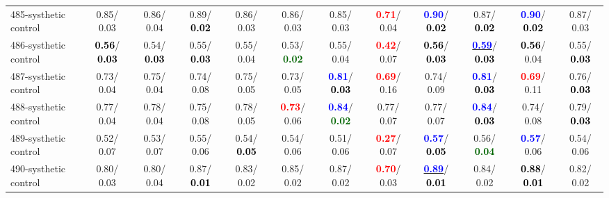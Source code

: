 \begin{table}[h]
\begin{center}
{\begin{tabular}{lc|c|c|c|c|c|c|c|c|c|c}
485-systhetic control &   0.85/  0.03 &   0.86/  0.04 &   0.89/\textcolor{black}{\textbf{  0.02}} &   0.86/  0.03 &   0.86/  0.03 &   0.85/  0.03 & \textcolor{red}{\textbf{  0.71}}/  0.04 & \textcolor{blue}{\textbf{  0.90}}/\textcolor{black}{\textbf{  0.02}} &   0.87/\textcolor{black}{\textbf{  0.02}} & \textcolor{blue}{\textbf{  0.90}}/\textcolor{black}{\textbf{  0.02}} &   0.87/  0.03 \\
486-systhetic control & \textcolor{black}{\textbf{  0.56}}/\textcolor{black}{\textbf{  0.03}} &   0.54/\textcolor{black}{\textbf{  0.03}} &   0.55/\textcolor{black}{\textbf{  0.03}} &   0.55/  0.04 &   0.53/\textcolor{darkgreen}{\textbf{  0.02}} &   0.55/  0.04 & \textcolor{red}{\textbf{  0.42}}/  0.07 & \textcolor{black}{\textbf{  0.56}}/\textcolor{black}{\textbf{  0.03}} & \underline{\textcolor{blue}{\textbf{  0.59}}}/\textcolor{black}{\textbf{  0.03}} & \textcolor{black}{\textbf{  0.56}}/  0.04 &   0.55/\textcolor{black}{\textbf{  0.03}} \\
487-systhetic control &   0.73/  0.04 &   0.75/  0.04 &   0.74/  0.08 &   0.75/  0.05 &   0.73/  0.05 & \textcolor{blue}{\textbf{  0.81}}/\textcolor{black}{\textbf{  0.03}} & \textcolor{red}{\textbf{  0.69}}/  0.16 &   0.74/  0.09 & \textcolor{blue}{\textbf{  0.81}}/\textcolor{black}{\textbf{  0.03}} & \textcolor{red}{\textbf{  0.69}}/  0.11 &   0.76/\textcolor{black}{\textbf{  0.03}} \\ \hline
488-systhetic control &   0.77/  0.04 &   0.78/  0.04 &   0.75/  0.08 &   0.78/  0.05 & \textcolor{red}{\textbf{  0.73}}/  0.06 & \textcolor{blue}{\textbf{  0.84}}/\textcolor{darkgreen}{\textbf{  0.02}} &   0.77/  0.07 &   0.77/  0.07 & \textcolor{blue}{\textbf{  0.84}}/\textcolor{black}{\textbf{  0.03}} &   0.74/  0.08 &   0.79/\textcolor{black}{\textbf{  0.03}} \\
489-systhetic control &   0.52/  0.07 &   0.53/  0.07 &   0.55/  0.06 &   0.54/\textcolor{black}{\textbf{  0.05}} &   0.54/  0.06 &   0.51/  0.06 & \textcolor{red}{\textbf{  0.27}}/  0.07 & \textcolor{blue}{\textbf{  0.57}}/\textcolor{black}{\textbf{  0.05}} &   0.56/\textcolor{darkgreen}{\textbf{  0.04}} & \textcolor{blue}{\textbf{  0.57}}/  0.06 &   0.54/  0.06 \\
490-systhetic control &   0.80/  0.03 &   0.80/  0.04 &   0.87/\textcolor{black}{\textbf{  0.01}} &   0.83/  0.02 &   0.85/  0.02 &   0.87/  0.02 & \textcolor{red}{\textbf{  0.70}}/  0.03 & \underline{\textcolor{blue}{\textbf{  0.89}}}/\textcolor{black}{\textbf{  0.01}} &   0.84/  0.02 & \textcolor{black}{\textbf{  0.88}}/\textcolor{black}{\textbf{  0.01}} &   0.82/  0.02 \\

\end{tabular}}
\end{center}
\end{table}
